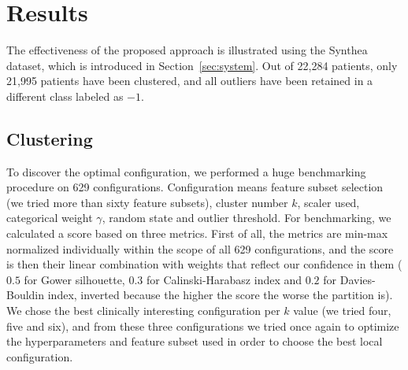 \section{Results}

\label{sec:results}

The effectiveness of the proposed approach is illustrated using the Synthea dataset, which is introduced in Section~\ref{sec:system}. Out of 22{,}284 patients, only 21{,}995 patients have been clustered, and all outliers have been retained in a different class labeled as $-1$.

\subsection{Clustering}

To discover the optimal configuration, we performed a huge benchmarking procedure on 629 configurations. Configuration means feature subset selection (we tried more than sixty feature subsets), cluster number $k$, scaler used, categorical weight $\gamma$, random state and outlier threshold. For benchmarking, we calculated a score based on three metrics. First of all, the metrics are min-max normalized individually within the scope of all 629 configurations, and the score is then their linear combination with weights that reflect our confidence in them ($0.5$ for Gower silhouette, $0.3$ for Calinski-Harabasz index and $0.2$ for Davies-Bouldin index, inverted because the higher the score the worse the partition is). We chose the best clinically interesting configuration per $k$ value (we tried four, five and six), and from these three configurations we tried once again to optimize the hyperparameters and feature subset used in order to choose the best local configuration.

